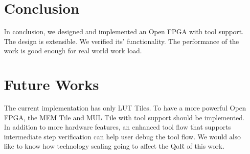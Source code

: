 \section{Conclusion}
\label{sec:conclu}

In conclusion, we designed and implemented an Open FPGA with tool support. The design
is extensible. We verified its' functionality. The performance of the work is good
enough for real world work load. \par

\section{Future Works}
\label{sec:future_works}

The current implementation has only LUT Tiles. To have a more powerful Open FPGA, 
the MEM Tile and MUL Tile with tool support should be implemented. 
In addition to more hardware features, an enhanced tool flow that supports intermediate
step verification can help user debug the tool flow. We would also like to know how 
technology scaling going to affect the QoR of this work. \par